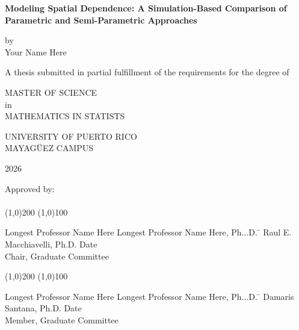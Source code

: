 



\thispagestyle{empty}
\begin{center}
\begin{singlespace}
\textbf{Modeling Spatial Dependence: A Simulation-Based Comparison of Parametric and Semi-Parametric Approaches}
\end{singlespace}
\vspace{4 mm}
by
\\
\vspace{4 mm}
Your Name Here %
\vspace{4 mm}
\begin{singlespace}
A thesis submitted in partial fulfillment of the requirements for the degree of %
\end{singlespace}
\vspace{4 mm}
MASTER OF SCIENCE %
\\
in
\\
MATHEMATICS IN STATISTS%
\\
\vspace{4 mm}
\begin{singlespace}

UNIVERSITY OF PUERTO RICO
\\
MAYAG\"UEZ CAMPUS
\end{singlespace}

2026 %
\end{center}
\bigskip
\bigskip
\bigskip
\bigskip
\bigskip
\bigskip
\bigskip

  \noindent Approved by:
\\
\\
  \noindent
\line(1,0){200} \hspace{40 mm} \line(1,0){100}\\
  \noindent
\vspace{-1.75\baselineskip}
  \begin{tabbing}
Longest Professor Name Here Longest Professor Name Here, Ph...D. \=  \kill 
Raul E. Macchiavelli, Ph.D. \>  Date\\Chair, Graduate Committee  %
\end{tabbing}


  \noindent
\line(1,0){200} \hspace{40 mm} \line(1,0){100}\\
  \noindent
\vspace{-1.75\baselineskip}
  \begin{tabbing}
Longest Professor Name Here Longest Professor Name Here, Ph...D. \=  \kill 
Damaris Santana, Ph.D. \>  Date\\Member, Graduate Committee  %
\end{tabbing}



